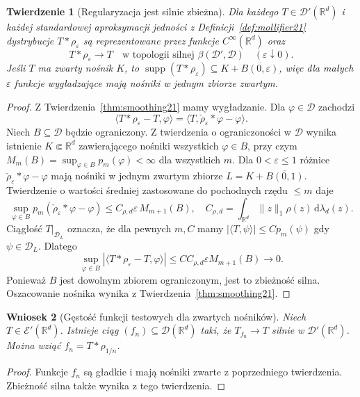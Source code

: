 \documentclass[11pt,a4paper]{article}
\numberwithin{equation}{section}
\theoremstyle{plain}
\newtheorem{twierdzenie}{Twierdzenie}[section]
\newtheorem{wniosek}[twierdzenie]{Wniosek}
\theoremstyle{definition}
\theoremstyle{remark}
\newcommand{\R}{\mathbb R}
\DeclareMathOperator{\supp}{supp}
\begin{document}
\begin{twierdzenie}[Regularyzacja jest silnie zbieżna]
\label{thm:strong-mollification21}
Dla każdego $T\in\mathcal D'(\R^d)$ i każdej
standardowej aproksymacji jedności z
Definicji~\ref{def:mollifier21} dystrybucje
$T*\rho_\varepsilon$ są reprezentowane przez funkcje
$C^\infty(\R^d)$ oraz
\[
 T*\rho_\varepsilon\longrightarrow T
 \quad\text{w topologii silnej }\beta(\mathcal D',\mathcal D)
 \quad(\varepsilon\downarrow0).
\]
Jeśli $T$ ma zwarty nośnik $K$, to
$\supp(T*\rho_\varepsilon)\subseteq K+
\overline{B(0,\varepsilon)}$, więc dla małych
$\varepsilon$ funkcje wygładzające mają nośniki
w jednym zbiorze zwartym.
\end{twierdzenie}
\begin{proof}
Z Twierdzenia~\ref{thm:smoothing21} mamy wygładzanie.
Dla $\varphi\in\mathcal D$ zachodzi
\[
 \langle T*\rho_\varepsilon-T,\varphi\rangle
 =\langle T,\check\rho_\varepsilon*\varphi-\varphi\rangle.
\]
Niech $B\subseteq\mathcal D$ będzie ograniczony.
Z twierdzenia o ograniczoności w $\mathcal D$
wynika istnienie $K\Subset\R^d$ zawierającego nośniki
wszystkich $\varphi\in B$, przy czym
$M_m(B)=\sup_{\varphi\in B}p_m(\varphi)<\infty$
dla wszystkich $m$. Dla $0<\varepsilon\le1$
różnice $\check\rho_\varepsilon*\varphi-\varphi$
mają nośniki w jednym zwartym zbiorze
$L=K+\overline{B(0,1)}$. Twierdzenie o wartości
średniej zastosowane do pochodnych rzędu $\le m$ daje
\[
 \sup_{\varphi\in B}p_m(\check\rho_\varepsilon*\varphi
 -\varphi)
 \le C_{\rho,d}\varepsilon\,M_{m+1}(B),
 \quad
 C_{\rho,d}=\int_{\R^d}\|z\|_1\rho(z)\,\mathrm d\lambda_d(z).
\]
Ciągłość $T|_{\mathcal D_L}$ oznacza, że dla pewnych
$m,C$ mamy $|\langle T,\psi\rangle|\le Cp_m(\psi)$
gdy $\psi\in\mathcal D_L$. Dlatego
\[
 \sup_{\varphi\in B}|\langle T*\rho_\varepsilon-T,
 \varphi\rangle|
 \le CC_{\rho,d}\varepsilon M_{m+1}(B)\longrightarrow0.
\]
Ponieważ $B$ jest dowolnym zbiorem ograniczonym,
jest to zbieżność silna. Oszacowanie nośnika wynika
z Twierdzenia~\ref{thm:smoothing21}.
\end{proof}

\begin{wniosek}[Gęstość funkcji testowych dla zwartych nośników]
\label{cor:dense-test-compact21}
Niech $T\in\mathcal E'(\R^d)$. Istnieje ciąg
$(f_n)\subseteq\mathcal D(\R^d)$ taki, że
$T_{f_n}\to T$ silnie w $\mathcal D'(\R^d)$.
Można wziąć $f_n=T*\rho_{1/n}$.
\end{wniosek}
\begin{proof}
Funkcje $f_n$ są gładkie i mają nośniki zwarte
z poprzedniego twierdzenia. Zbieżność silna także
wynika z tego twierdzenia.
\end{proof}
\end{document}
